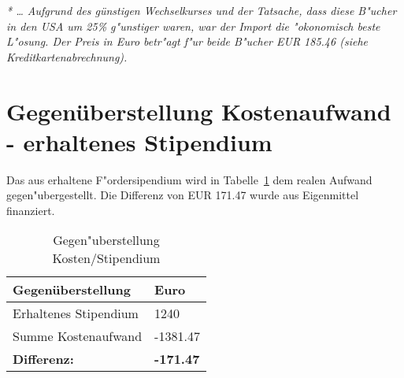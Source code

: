 \documentclass[a4paper,fleqn]{article}
\begin{document}
\textit{* \ldots{} Aufgrund des g\"unstigen Wechselkurses und der Tatsache,
dass diese B"ucher in den USA um 25\% g"unstiger waren, war der Import
die "okonomisch beste L"osung. Der Preis in Euro betr"agt f"ur beide
B"ucher EUR 185.46 (siehe Kreditkartenabrechnung).}

\newpage
\section{Gegen\"uberstellung Kostenaufwand - erhaltenes Stipendium}

Das aus erhaltene  F"ordersipendium wird in
Tabelle~\ref{table:Finanzierungsplan} dem realen Aufwand
gegen"ubergestellt. Die Differenz von EUR 171.47 wurde aus Eigenmittel
finanziert.

\begin{table}[ht]
  \centering
  \caption{Gegen"uberstellung Kosten/Stipendium}
  \label{table:Finanzierungsplan}
  \begin{tabular}{|l|l|}
    \hline
    Gegen\"uberstellung                           & Euro \\
    \hline
    Erhaltenes Stipendium                         & 1240    \\
    Summe Kostenaufwand                           &-1381.47 \\
    \hline
    \textbf{Differenz:}                    &\textbf{-171.47}\\
    \hline
  \end{tabular}
\end{table}
\end{document}
